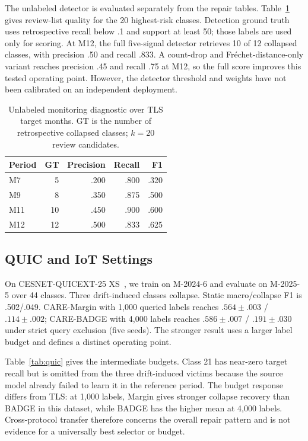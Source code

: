 \documentclass[journal]{IEEEtran}
\newcommand{\ours}{CARE}
\begin{document}
The unlabeled detector is evaluated separately from the repair tables. Table~\ref{tab:detect} gives review-list quality for the 20 highest-risk classes. Detection ground truth uses retrospective recall below .1 and support at least 50; those labels are used only for scoring. At M12, the full five-signal detector retrieves 10 of 12 collapsed classes, with precision .50 and recall .833. A count-drop and Fr\'echet-distance-only variant reaches precision .45 and recall .75 at M12, so the full score improves this tested operating point. However, the detector threshold and weights have not been calibrated on an independent deployment.

\begin{table}[!t]
\centering
\caption{Unlabeled monitoring diagnostic over TLS target months. GT is the number of retrospective collapsed classes; $k=20$ review candidates.}
\label{tab:detect}
\scriptsize
\setlength{\tabcolsep}{5pt}
\begin{tabular}{@{}lrrrr@{}}
\toprule
Period & GT & Precision & Recall & F1\\
\midrule
M7 & 5 & .200 & .800 & .320\\
M9 & 8 & .350 & .875 & .500\\
M11 & 10 & .450 & .900 & .600\\
M12 & 12 & .500 & .833 & .625\\
\bottomrule
\end{tabular}
\end{table}

\subsection{QUIC and IoT Settings}
On CESNET-QUICEXT-25 XS~\cite{cesnetquicext25,mucke2025waiting}, we train on M-2024-6 and evaluate on M-2025-5 over 44 classes. Three drift-induced classes collapse. Static macro/collapse F1 is .502/.049. \ours{}-Margin with 1,000 queried labels reaches $.564\pm.003$ / $.114\pm.002$; \ours{}-BADGE with 4,000 labels reaches $.586\pm.007$ / $.191\pm.030$ under strict query exclusion (five seeds). The stronger result uses a larger label budget and defines a distinct operating point.

Table~\ref{tab:quic} gives the intermediate budgets. Class 21 has near-zero target recall but is omitted from the three drift-induced victims because the source model already failed to learn it in the reference period. The budget response differs from TLS: at 1,000 labels, Margin gives stronger collapse recovery than BADGE in this dataset, while BADGE has the higher mean at 4,000 labels. Cross-protocol transfer therefore concerns the overall repair pattern and is not evidence for a universally best selector or budget.
\end{document}
